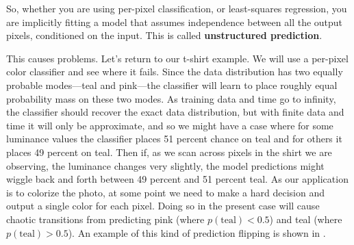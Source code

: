 



So, whether you are using per-pixel classification, or least-squares regression, you are implicitly fitting a model that assumes independence between all the output pixels, conditioned on the input. This is called \textbf{unstructured prediction}.

This causes problems. Let's return to our t-shirt example. We will use a per-pixel color classifier and see where it fails. Since the data distribution has two equally probable modes—teal and pink—the classifier will learn to place roughly equal probability mass on these two modes. As training data and time go to infinity, the classifier should recover the exact data distribution, but with finite data and time it will only be approximate, and so we might have a case where for some luminance values the classifier places 51 percent chance on teal and for others it places 49 percent on teal. Then if, as we scan across pixels in the shirt we are observing, the luminance changes very slightly, the model predictions might wiggle back and forth between 49 percent and 51 percent teal. As our application is to colorize the photo, at some point we need to make a hard decision and output a single color for each pixel. Doing so in the present case will cause chaotic transitions from predicting pink (where $p(\text{teal}) < 0.5$) and teal (where $p(\text{teal}) > 0.5$). An example of this kind of prediction flipping is shown in \fig{\ref{fig:conditional_generative_models:cgen_tshirt_color_inconsistency}}.


